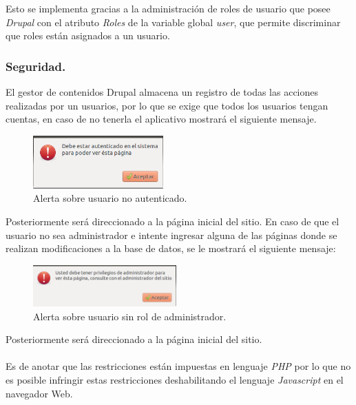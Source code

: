 Esto se implementa gracias a la administración de roles de usuario que posee \textit{Drupal} con el atributo \textit{Roles} de la variable global \textit{user}, que permite discriminar que roles están asignados a un usuario.

\subsubsection{Seguridad.}

El gestor de contenidos Drupal almacena un registro de todas las acciones realizadas por un usuarios, por lo que se exige que todos los usuarios tengan cuentas, en caso de no tenerla el aplicativo mostrará el siguiente mensaje.

\begin{figure}[H]
	\centering
	\includegraphics[width=5cm]{Capitulo8InterfacesWeb/Imagenes/Autenticado.png}
	\caption{Alerta sobre usuario no autenticado.}
	\label{fig:estruApp}	
\end{figure}

Posteriormente será direccionado a la página inicial del sitio. En caso de que el usuario no sea administrador e intente ingresar alguna de las páginas donde se realizan modificaciones a la base de datos, se le mostrará el siguiente mensaje:

\begin{figure}[H]
	\centering
	\includegraphics[width=5.5cm]{Capitulo8InterfacesWeb/Imagenes/Administrador.png}
	\caption{Alerta sobre usuario sin rol de administrador.}
	\label{fig:estruApp}	
\end{figure}

Posteriormente será direccionado a la página inicial del sitio.\\\\
Es de anotar que las restricciones están impuestas en lenguaje \textit{PHP} por lo que no es posible infringir estas restricciones deshabilitando el lenguaje \textit{Javascript} en el navegador Web.

